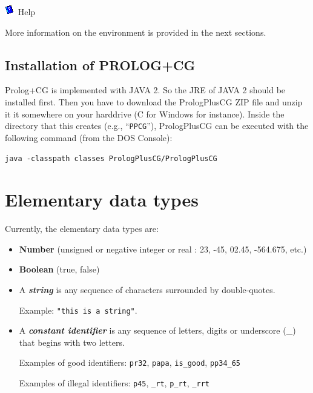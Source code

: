 \documentclass{book}
\begin{document}
\includegraphics{help.png} Help

More information on the environment is provided in the next sections.

\subsection{Installation of PROLOG+CG}

Prolog+CG is implemented with JAVA 2. So the JRE of JAVA 2 should be
installed first. Then you have to download the PrologPlusCG ZIP file
and unzip it it somewhere on your harddrive (C for Windows for
instance). Inside the directory that this creates (e.g.,
``\texttt{PPCG}''), PrologPlusCG can be executed with the following
command (from the DOS Console):

\begin{center}
\texttt{java -classpath classes PrologPlusCG/PrologPlusCG}
\end{center}

\section{Elementary data types}\label{Sec:ElmentaryDataTypes}

Currently, the elementary data types are:

\begin{itemize}

  \item {\bf Number} (unsigned or negative integer or real : 23, -45,
    02.45, -564.675, etc.)

  \item {\bf Boolean} (true, false)

  \item A {\bf {\it string}} is any
sequence of characters surrounded by double-quotes.

Example: \texttt{"this is a string"}.

  \item A {\bf {\it constant identifier}} is any sequence of letters,
digits or underscore (\_) that begins with two letters.  

Examples of good identifiers: \texttt{pr32}, \texttt{papa},
\texttt{is\_good}, \texttt{pp34\_65}

Examples of illegal identifiers: \texttt{p45}, \texttt{\_rt},
\texttt{p\_rt}, \texttt{\_rrt}

\end{itemize}
\end{document}
